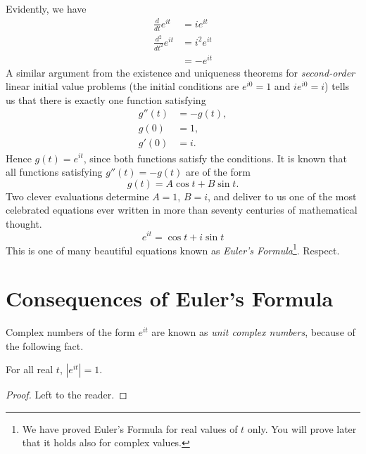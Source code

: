 \documentclass[twocolumn,12pt]{article}
\begin{document}
Evidently, we have
\begin{align*}
  \frac{d}{dt} e^{it} &= ie^{it} \\
  \frac{d^2}{dt^2} e^{it} &= i^2 e^{it} \\
    &= -e^{it}
\end{align*}
A similar argument from the existence and uniqueness theorems for \emph{second-order} linear initial value problems (the initial conditions are $e^{i0} = 1$ and $ie^{i0} = i$) tells us that there is exactly one function satisfying 
\begin{align*}
g''(t) &= -g(t), \\
g(0)   &= 1, \\
g'(0)  &= i.
\end{align*}
Hence $g(t) = e^{it}$, since both functions satisfy the conditions. It is known that all functions satisfying $g''(t) = -g(t)$ are of the form
\[
  g(t) = A \cos t + B \sin t.
\]
Two clever evaluations determine $A = 1$, $B = i$, and deliver to us one of the most celebrated equations ever written in more than seventy centuries of mathematical thought.
\[ 
    \boxed{e^{it} = \cos t + i \sin t}
\]
This is one of many beautiful equations known as \emph{Euler's Formula}\footnote{We have proved Euler's Formula for real values of $t$ only. You will prove later that it holds also for complex values.}. Respect.
%
\section{Consequences of Euler's Formula}
Complex numbers of the form $e^{it}$ are known as \emph{unit complex numbers}, because of the following fact.
\begin{proposition}
  For all real $t$, $|e^{it}| = 1$.
\end{proposition}
\begin{proof}
  Left to the reader.
\end{proof}
\end{document}
